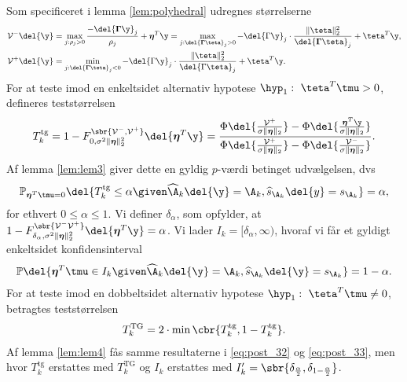 Som specificeret i lemma \ref{lem:polyhedral} udregnes størrelserne
\begin{align*}
\mathcal{V}^- \del{\y} &=  \max_{j: \rho_j > 0} \frac{- \del{\boldsymbol{\Gamma} \y}_j}{\rho_j} + \boldsymbol{\eta}^T \y = \max_{j: \del{\boldsymbol{\Gamma} \teta}_j > 0} - \del{\Gamma \y}_j \cdot \frac{\Vert \teta \Vert_2^2}{\del{\boldsymbol{\Gamma} \teta}_j} + \teta^T \y, \\
\mathcal{V}^+ \del{\y} &=\min_{j: \del{\boldsymbol{\Gamma} \teta}_j < 0} - \del{\Gamma \y}_j \cdot \frac{\Vert \teta \Vert_2^2}{\del{\Gamma \teta}_j} + \teta^T \y.
\end{align*}
%
For at teste imod en enkeltsidet alternativ hypotese \(\hyp_1: \ \teta^T \tmu > 0\),  defineres teststørrelsen
\begin{align*}
T_k^\text{tg}=1- F_{0, \sigma^2 \Vert \boldsymbol{\eta} \Vert_2^2}^{\sbr{\mathcal{V}^-, \mathcal{V}^+}} \del{\boldsymbol{\eta}^T \y} = \frac{\Phi \del{\frac{\mathcal{V}^+}{\sigma \Vert \boldsymbol{\eta} \Vert_2}}-\Phi \del{\frac{\boldsymbol{\eta}^T \y}{\sigma  \Vert \boldsymbol{\eta} \Vert_2}}}{\Phi \del{\frac{\mathcal{V}^+}{\sigma  \Vert \boldsymbol{\eta} \Vert_2}}-\Phi \del{\frac{\mathcal{V}^-}{\sigma \Vert \boldsymbol{\eta} \Vert_2}}}.
\end{align*}
Af lemma \ref{lem:lem3} giver dette en gyldig \(p\)-værdi betinget udvælgelsen, dvs
\begin{align}
\mathbb{P}_{\boldsymbol{\eta}^T \tmu = 0} \del{T_k^\text{tg} \leq \alpha \given \widehat{\A}_k \del{\y} = \A_k, \widehat{s}_{\A_k} \del{y} = s_{\A_k}} = \alpha, \label{eq:post_32}
\end{align}
for ethvert \(0 \leq \alpha \leq 1\).
Vi definer  \(\delta_\alpha\), som opfylder, at \(1-F_{\delta_{\alpha}, \sigma^2 \Vert \boldsymbol{\eta} \Vert_2^2}^{\sbr{\mathcal{V}^- \mathcal{V}^+}} \del{\boldsymbol{\eta}^T \y} = \alpha\).
Vi lader \(I_k = [\delta_\alpha, \infty)\), hvoraf vi får et gyldigt enkeltsidet konfidensinterval
\begin{align}
\mathbb{P} \del{\boldsymbol{\eta}^T \tmu \in I_k \given \widehat{\A}_k \del{\y} = \A_k, \widehat{s}_{\A_k} \del{\y} = s_{\A_k}} = 1-\alpha. \label{eq:post_33}
\end{align}
For at teste imod en dobbeltsidet alternativ hypotese \(\hyp_1: \ \teta^T \tmu \neq 0\), betragtes teststørrelsen
\begin{align*}
T_k^\text{TG}= 2 \cdot \min \cbr{T_k^{\text{tg}}, 1-T_k^{\text{tg}}}.
\end{align*}
Af lemma \ref{lem:lem4} fås samme resultaterne i \eqref{eq:post_32} og \eqref{eq:post_33}, men hvor \(T_k^\text{tg}\) erstattes med \(T_k^\text{TG}\) og \(I_k\) erstattes med \(I_k'= \sbr{\delta_{\frac{\alpha}{2}}, \delta_{1-\frac{\alpha}{2}}}\).

